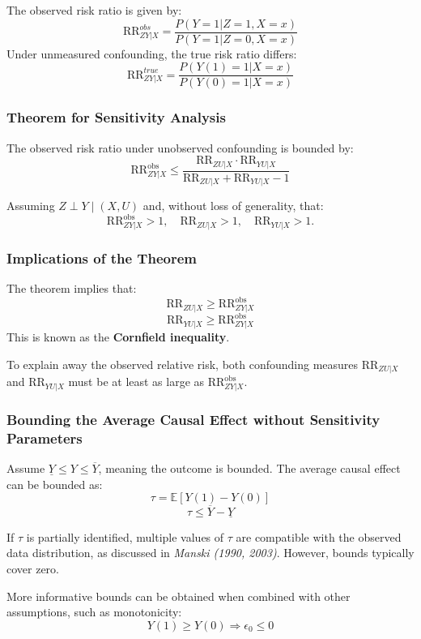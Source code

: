 The observed risk ratio is given by:
\[
\text{RR}_{ZY|X}^{obs} = \frac{P(Y=1|Z=1, X=x)}{P(Y=1|Z=0, X=x)}
\]
Under unmeasured confounding, the true risk ratio differs:
\[
\text{RR}_{ZY|X}^{true} = \frac{P(Y(1)=1|X=x)}{P(Y(0)=1|X=x)}
\]

\subsubsection{Theorem for Sensitivity Analysis}

The observed risk ratio under unobserved confounding is bounded by:
\[
\text{RR}_{ZY|X}^{\text{obs}} \leq \frac{\text{RR}_{ZU|X} \cdot \text{RR}_{YU|X}}{\text{RR}_{ZU|X} + \text{RR}_{YU|X} - 1}
\]

Assuming \( Z \perp Y \mid (X, U) \) and, without loss of generality, that:
\[
\text{RR}_{ZY|X}^{\text{obs}} > 1, \quad \text{RR}_{ZU|X} > 1, \quad \text{RR}_{YU|X} > 1.
\]

\subsubsection{Implications of the Theorem}

The theorem implies that:
\[
\text{RR}_{ZU|X} \geq \text{RR}_{ZY|X}^{\text{obs}}
\]
\[
\text{RR}_{YU|X} \geq \text{RR}_{ZY|X}^{\text{obs}}
\]
This is known as the \textbf{Cornfield inequality}. 

To explain away the observed relative risk, both confounding measures \(\text{RR}_{ZU|X}\) and \(\text{RR}_{YU|X}\) must be at least as large as \(\text{RR}_{ZY|X}^{\text{obs}}\).


\subsubsection{Bounding the Average Causal Effect without Sensitivity Parameters}

Assume \( \underline{Y} \leq Y \leq \overline{Y} \), meaning the outcome is bounded. The average causal effect can be bounded as:
\[
\tau = \mathbb{E}[Y(1) - Y(0)]
\]
\[
\tau \leq \overline{Y} - \underline{Y}
\]

If \(\tau\) is partially identified, multiple values of \(\tau\) are compatible with the observed data distribution, as discussed in \emph{Manski (1990, 2003)}. However, bounds typically cover zero.

More informative bounds can be obtained when combined with other assumptions, such as monotonicity:
\[
Y(1) \geq Y(0) \Rightarrow \epsilon_0 \leq 0
\]

